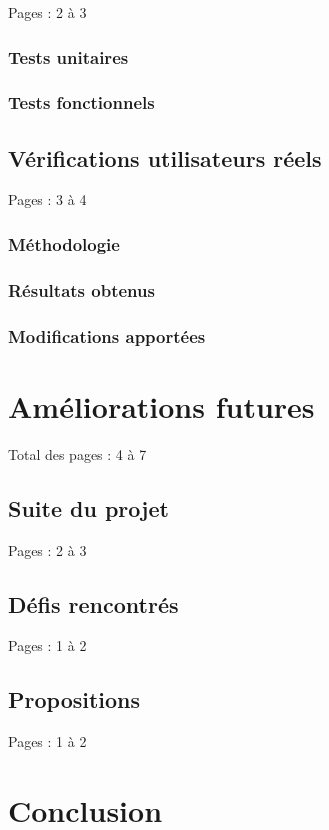 \documentclass{eplmastersthesis_FR}
\begin{document}
			Pages : 2 à 3

			\subsection*{Tests unitaires}
			\subsection*{Tests fonctionnels}

		\section{Vérifications utilisateurs réels}

			Pages : 3 à 4

			\subsection*{Méthodologie}
			\subsection*{Résultats obtenus}
			\subsection*{Modifications apportées}

	\chapter{Améliorations futures}

		Total des pages : 4 à 7

		\section{Suite du projet}

			Pages : 2 à 3

		\section{Défis rencontrés}

			Pages : 1 à 2

		\section{Propositions}

			Pages : 1 à 2

	\chapter{Conclusion}
\end{document}
